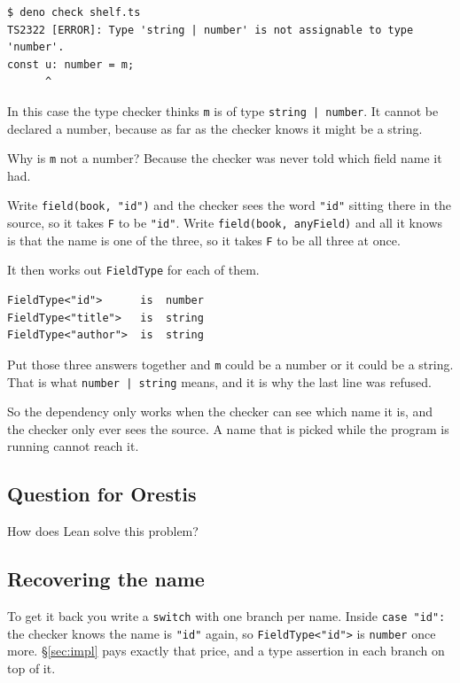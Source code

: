 \documentclass[11pt,a4paper]{article}
\begin{document}
\begin{pinkbox}
\begin{lstlisting}[language=SH]
$ deno check shelf.ts
TS2322 [ERROR]: Type 'string | number' is not assignable to type 'number'.
const u: number = m;
      ^
\end{lstlisting}

In this case the type checker thinks \texttt{m} is of type \texttt{string | number}. It cannot be
declared a number, because as far as the checker knows it might be a string.

Why is \texttt{m} not a number? Because the checker was never told which field name it had.

Write \texttt{field(book, "id")} and the checker sees the word \texttt{"id"} sitting there in the
source, so it takes \texttt{F} to be \texttt{"id"}. Write \texttt{field(book, anyField)} and all it
knows is that the name is one of the three, so it takes \texttt{F} to be all three at once.

It then works out \texttt{FieldType} for each of them.

\begin{lstlisting}[language=TS]
FieldType<"id">      is  number
FieldType<"title">   is  string
FieldType<"author">  is  string
\end{lstlisting}

Put those three answers together and \texttt{m} could be a number or it could be a string. That is
what \texttt{number | string} means, and it is why the last line was refused.

So the dependency only works when the checker can see which name it is, and the checker only ever
sees the source. A name that is picked while the program is running cannot reach it.

\begin{orestisbox}
\subsection{Question for Orestis}

How does Lean solve this problem?
\end{orestisbox}

\subsection{Recovering the name}

To get it back you write a \texttt{switch} with one branch per name. Inside \texttt{case "id":} the
checker knows the name is \texttt{"id"} again, so \texttt{FieldType<"id">} is \texttt{number} once
more. §\ref{sec:impl} pays exactly that price, and a type assertion in each branch on top of it.


\end{pinkbox}
\end{document}
